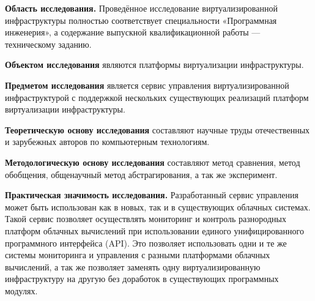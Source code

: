 \textbf{Область исследования.}
Проведённое исследование виртуализированной инфраструктуры полностью соответствует специальности «Программная инженерия», а содержание выпускной квалификационной работы --- техническому заданию.

\textbf{Объектом исследования} являются платформы виртуализации инфраструктуры.

\textbf{Предметом исследования} является сервис управления виртуализированной инфраструктурой с поддержкой нескольких существующих реализаций платформ виртуализации инфраструктуры.

\textbf{Теоретическую основу исследования} составляют научные труды отечественных и зарубежных авторов по компьютерным технологиям.

\textbf{Методологическую основу исследования} составляют метод сравнения, метод обобщения, общенаучный метод абстрагирования, а так же эксперимент.



\textbf{Практическая значимость исследования.} Разработанный сервис управления может быть использован как в новых, так и в существующих облачных системах.
Такой сервис позволяет осуществлять мониторинг и контроль разнородных платформ облачных вычислений при использовании единого унифицированного программного интерфейса (API).
Это позволяет использовать одни и те же системы мониторинга и управления с разными платформами облачных вычислений, а так же позволяет заменять одну виртуализированную инфраструктуру на другую без доработок в существующих программных модулях.



